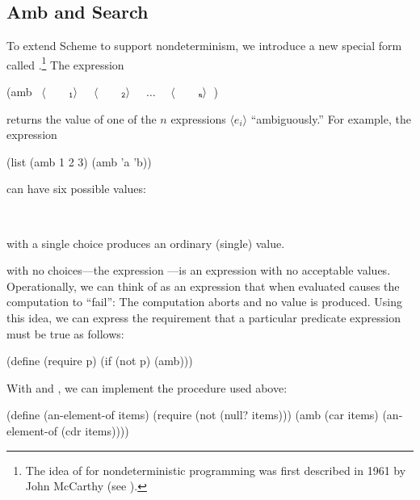 \subsection{Amb and Search}
\label{Section 4.3.1}

To extend Scheme to support nondeterminism, we introduce a new special form
called .\footnote{The idea of  for nondeterministic
programming was first described in 1961 by John McCarthy (see ).}
The expression

\begin{codeBlock}
(amb ~\(\langle \)~~~~\(_{\mono{1}}\rangle \)~ ~\(\langle \)~~~~\(_{\mono{2}}\rangle \)~ ~\( \dots \)~ ~\(\langle \)~~~~\(_{\monoItalic{n}}\rangle \)~)
\end{codeBlock}

\noindent
returns the value of one of the \( n \) expressions \( \langle \)\( e_i \)\( \rangle \)
``ambiguously.''  For example, the expression

\begin{codeBlock}
(list (amb 1 2 3) (amb 'a 'b))
\end{codeBlock}

\noindent
can have six possible values:

\begin{codeBlock}
~~ ~~ ~~ ~~ ~~ ~~
\end{codeBlock}

\noindent
{} with a single choice produces an ordinary (single) value.

 with no choices---the expression ---is an expression
with no acceptable values.  Operationally, we can think of  as an
expression that when evaluated causes the computation to ``fail'': The
computation aborts and no value is produced.  Using this idea, we can express
the requirement that a particular predicate expression  must be true as
follows:

\begin{codeBlock}
(define (require p) (if (not p) (amb)))
\end{codeBlock}

\noindent
With  and , we can implement the 
procedure used above:

\begin{codeBlock}
(define (an-element-of items)
  (require (not (null? items)))
  (amb (car items) (an-element-of (cdr items))))
\end{codeBlock}

